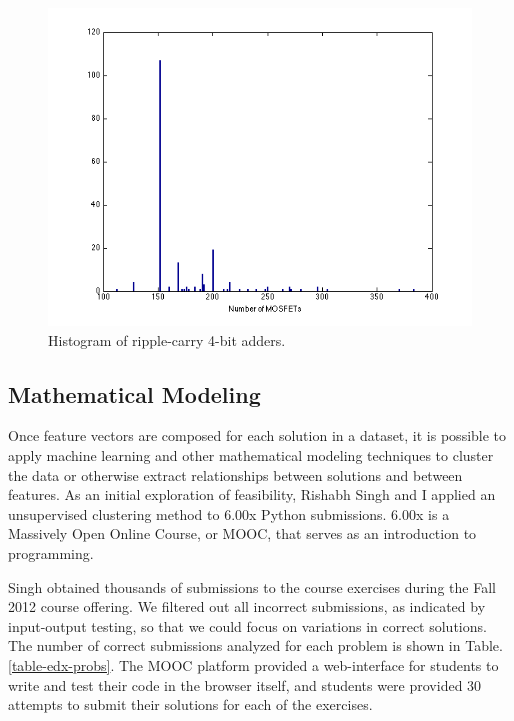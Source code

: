 \documentclass[12pt]{article}
\begin{document}
\begin{figure}
\centering
\includegraphics[scale=0.8]{histOfTotalCircuitSizeLab2.png}
\caption{Histogram of ripple-carry 4-bit adders.}
\label{4bitAdders}
\end{figure}


\subsection{Mathematical Modeling}

Once feature vectors are composed for each solution in a dataset, it is possible to apply machine learning and other mathematical modeling techniques to cluster the data or otherwise extract relationships between solutions and between features. As an initial exploration of feasibility, Rishabh Singh and I applied an unsupervised clustering method to 6.00x Python submissions. 6.00x is a Massively Open Online Course, or MOOC, that serves as an introduction to programming.

Singh obtained thousands of submissions to the course exercises during the Fall 2012 course offering. We filtered out all incorrect submissions, as indicated by input-output testing, so that we could focus on variations in correct solutions. The number of correct submissions analyzed for each problem is shown in Table. \ref{table-edx-probs}. The MOOC platform provided a web-interface for students to write and test their code in the browser itself, and students were provided 30 attempts to submit their solutions for each of the exercises.
\end{document}
